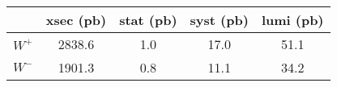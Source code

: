 
     \begin{tabular}{lcccc}
      \hline
      \hline
      & xsec (pb) & stat (pb) & syst (pb) & lumi (pb) \\
      \hline
      $W^+$ & 2838.6 & 1.0  & 17.0 & 51.1  \\
      $W^-$ & 1901.3 & 0.8  & 11.1 & 34.2  \\
      \hline
      \hline
    \end{tabular}

    

